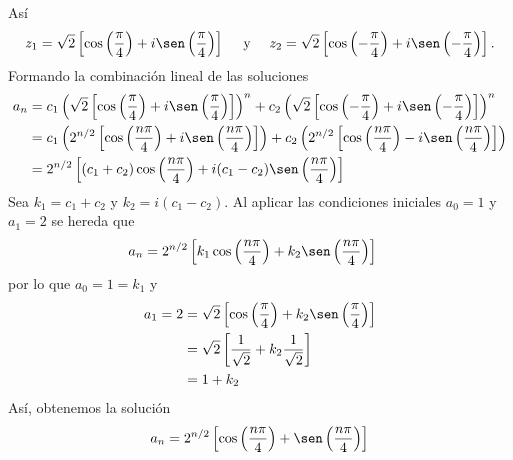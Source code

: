 \begin{myexample}
\begin{center}
    \end{center}
    Así
    $$z_1 = \sqrt{2} \left[ \cos \left( \frac{\pi}{4} \right) + i \sen \left( \frac{\pi}{4} \right)\right] \quad \text{ y } \quad z_2 = \sqrt{2} \left[ \cos \left( -\frac{\pi}{4} \right) + i \sen \left( -\frac{\pi}{4} \right)\right].$$
    Formando la combinación lineal de las soluciones
    \begin{align*}
        a_n & = c_1 \left( \sqrt{2} \left[ \cos \left( \frac{\pi}{4} \right) + i \sen \left( \frac{\pi}{4} \right)\right] \right)^{n} + c_2 \left( \sqrt{2} \left[ \cos \left( -\frac{\pi}{4} \right) + i \sen \left( -\frac{\pi}{4} \right)\right] \right)^{n} \\
        & = c_1 \left( 2^{n/2} \left[ \cos \left( \frac{n\pi}{4} \right) + i \sen \left( \frac{n\pi}{4} \right)\right] \right) + c_2 \left( 2^{n/2} \left[ \cos \left( \frac{n\pi}{4} \right) - i \sen \left( \frac{n\pi}{4} \right)\right] \right) \\
        & = 2^{n/2} \left[ (c_1 + c_2) \cos \left( \frac{n\pi}{4} \right) + i(c_1 - c_2) \sen \left( \frac{n\pi}{4} \right) \right]
    \end{align*}
    Sea $k_1 = c_1 + c_2$ y $k_2 = i (c_1 - c_2)$. Al aplicar las condiciones iniciales $a_0 = 1$ y $a_1 = 2$ se hereda que
    \begin{align*}
        a_n & = 2^{n/2} \left[ k_1 \cos \left( \frac{n\pi}{4} \right) + k_2 \sen \left( \frac{n\pi}{4} \right) \right]
    \end{align*}
    por lo que $a_0 = 1 = k_1$ y
    \begin{align*}
        a_1 = 2 & = \sqrt{2} \left[ \cos \left( \frac{\pi}{4} \right) + k_2 \sen \left( \frac{\pi}{4} \right) \right] \\
        & = \sqrt{2} \left[ \frac{1}{\sqrt{2}} + k_2 \frac{1}{\sqrt{2}} \right] \\
        & = 1 + k_2
    \end{align*}
    Así, obtenemos la solución
    $$a_n = 2^{n/2} \left[ \cos \left( \frac{n\pi}{4} \right) + \sen \left( \frac{n\pi}{4} \right) \right]$$
\end{myexample}

